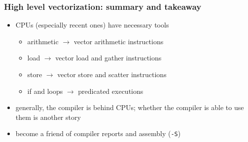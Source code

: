\documentclass[12pt,dvipdfmx]{beamer}
\begin{document}
\begin{frame}[fragile]
  \frametitle{High level vectorization: summary and takeaway}
  \begin{itemize}
  \item CPUs (especially recent ones) have necessary tools
    \begin{itemize}
    \item arithmetic $\rightarrow$ vector arithmetic instructions
    \item load $\rightarrow$ vector load and gather instructions
    \item store $\rightarrow$ vector store and scatter instructions
    \item if and loops $\rightarrow$ predicated executions
    \end{itemize}
  \item generally, the compiler is behind CPUs;
    whether the compiler is able to use them is another story
  \item become a friend of compiler reports and assembly ({\tt -S})
  \end{itemize}
\end{frame}
\end{document}
